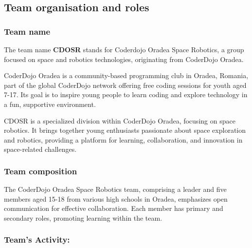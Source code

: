 \subsection{Team organisation and roles}

\subsubsection{Team name}
The team name {\textbf{CDOSR}} stands for Coderdojo Oradea Space Robotics, a group focused on space and robotics technologies, originating from CoderDojo Oradea. 

CoderDojo Oradea is a community-based programming club in Oradea, Romania, part of the global CoderDojo network offering free coding sessions for youth aged 7-17. Its goal is to inspire young people to learn coding and explore technology in a fun, supportive environment.

CDOSR is a specialized division within CoderDojo Oradea, focusing on space robotics. It brings together young enthusiasts passionate about space exploration and robotics, providing a platform for learning, collaboration, and innovation in space-related challenges.


\subsubsection{Team composition}

The CoderDojo Oradea Space Robotics team, comprising a leader and five members aged 15-18 from various high schools in Oradea, emphasizes open communication for effective collaboration. Each member has primary and secondary roles, promoting learning within the team.
\vspace{1cm}
\begin{itemize}
    
    
    
    
    
    
\end{itemize}

\subsubsection{Team's Activity:} 


